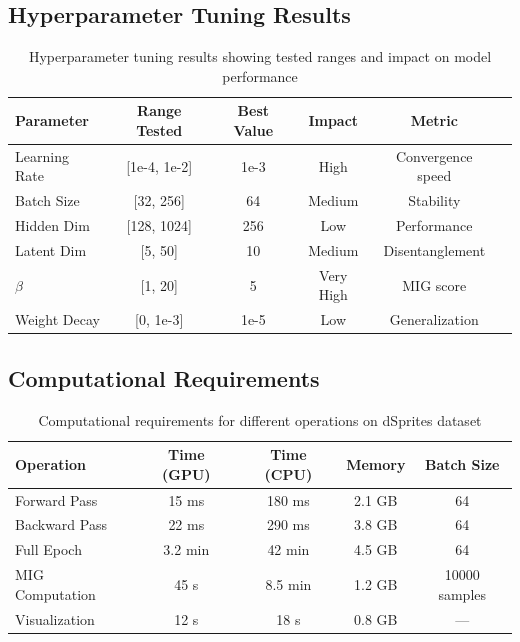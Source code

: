 \documentclass[conference]{IEEEtran}
\begin{document}
\subsection{Hyperparameter Tuning Results}

\begin{table}[!t]
\centering
\small
\begin{tabular}{@{}lccccc@{}}
\toprule
\textbf{Parameter} & \textbf{Range Tested} & \textbf{Best Value} & \textbf{Impact} & \textbf{Metric} \\ \midrule
Learning Rate & [1e-4, 1e-2] & 1e-3 & High & Convergence speed \\
Batch Size & [32, 256] & 64 & Medium & Stability \\
Hidden Dim & [128, 1024] & 256 & Low & Performance \\
Latent Dim & [5, 50] & 10 & Medium & Disentanglement \\
$\beta$ & [1, 20] & 5 & Very High & MIG score \\
Weight Decay & [0, 1e-3] & 1e-5 & Low & Generalization \\ \bottomrule
\end{tabular}
\caption{Hyperparameter tuning results showing tested ranges and impact on model performance}
\label{tab:hyperparameter_tuning}
\end{table}

\subsection{Computational Requirements}

\begin{table}[!t]
\centering
\begin{tabular}{@{}lcccc@{}}
\toprule
\textbf{Operation} & \textbf{Time (GPU)} & \textbf{Time (CPU)} & \textbf{Memory} & \textbf{Batch Size} \\ \midrule
Forward Pass & 15 ms & 180 ms & 2.1 GB & 64 \\
Backward Pass & 22 ms & 290 ms & 3.8 GB & 64 \\
Full Epoch & 3.2 min & 42 min & 4.5 GB & 64 \\
MIG Computation & 45 s & 8.5 min & 1.2 GB & 10000 samples \\
Visualization & 12 s & 18 s & 0.8 GB & --- \\ \bottomrule
\end{tabular}
\caption{Computational requirements for different operations on dSprites dataset}
\label{tab:computation}
\end{table}
\end{document}
